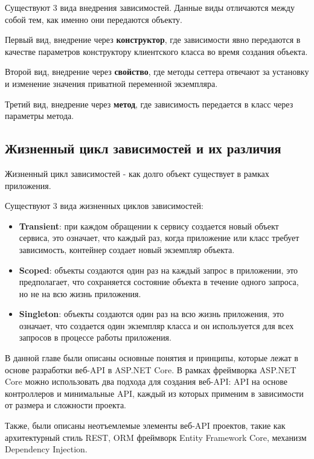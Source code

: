\documentclass[a4paper,12pt]{report}
\begin{document}
Существуют 3 вида внедрения зависимостей. Данные виды отличаются между собой тем, как именно они передаются объекту.

Первый вид, внедрение через \textbf{конструктор}, где зависимости явно передаются в качестве параметров конструктору клиентского класса во время создания объекта.

Второй вид, внедрение через \textbf{свойство}, где методы сеттера отвечают за установку и изменение значения приватной переменной экземпляра.

Третий вид, внедрение через \textbf{метод}, где зависимость передается в класс через параметры метода.

\subsection{Жизненный цикл зависимостей и их различия}

Жизненный цикл зависимостей - как долго объект существует в рамках приложения. 

Существуют 3 вида жизненных циклов зависимостей:
\begin{itemize}
    \item
        \textbf{Transient}: при каждом обращении к сервису создается новый объект сервиса, это означает, что каждый раз, 
        когда приложение или класс требует зависимость, контейнер создает новый экземпляр объекта.
    \item
        \textbf{Scoped}: объекты создаются один раз на каждый запрос в приложении, это предполагает, 
        что сохраняется состояние объекта в течение одного запроса, но не на всю жизнь приложения.
    \item
        \textbf{Singleton}:  объекты создаются один раз на всю жизнь приложения, это означает, 
        что создается один экземпляр класса и он используется для всех запросов в процессе работы приложения. 
\end{itemize}


В данной главе были описаны основные понятия и принципы, которые лежат в основе разработки веб-\acs{API} в ASP.NET Core. 
В рамках фреймворка ASP.NET Core можно использовать два подхода для создания веб-\acs{API}: \acs{API} на основе контроллеров и минимальные \acs{API}, 
каждый из которых применим в зависимости от размера и сложности проекта.

Также, были описаны неотъемлемые элементы веб-\acs{API} проектов, такие как архитектурный стиль \acs{REST}, \acs{ORM} фреймворк Entity Framework Core, 
механизм Dependency Injection.
\end{document}
